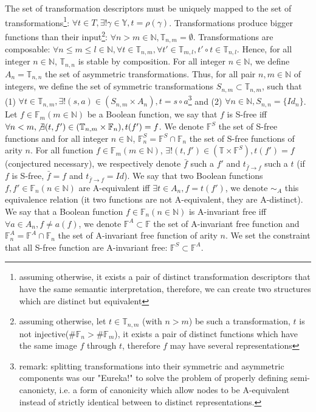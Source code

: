 \documentclass[a4paper,10pt]{article}
\newcommand{\N}{\mathbb{N}}%
\newcommand{\F}{\mathbb{F}}
\newcommand{\Y}{\mathbb{Y}}
\newcommand{\T}{\mathbb{T}}
\begin{document}
The set of transformation descriptors must be uniquely mapped to the set of transformations\footnote{assuming otherwise, it exists a pair of distinct transformation descriptors that have the same semantic interpretation, therefore, we can create two structures which are distinct but equivalent}: $\forall t\in T, \exists!\gamma\in\Y, t=\rho(\gamma)$.
Transformations produce bigger functions than their input\footnote{assuming otherwise, let $t\in\T_{n, m}$ (with $n>m$) be such a transformation, $t$ is not injective($\#\F_n > \#\F_m$), it exists a pair of distinct functions which have the same image $f$ through $t$, therefore $f$ may have several representations}: $\forall n > m \in\N, \T_{n, m}=\emptyset$.
Transformations are composable: $\forall n \leq m \leq l\in\N, \forall t\in\T_{n, m}, \forall t'\in\T_{m, l}, t' \circ t \in\T_{n, l}$.
Hence, for all integer $n\in\N$, $\T_{n, n}$ is stable by composition.
For all integer $n\in\N$, we define $A_n = \T_{n, n}$ the set of asymmetric transformations.
Thus, for all pair $n, m\in\N$ of integers, we define the set of symmetric transformations $S_{n, m} \subset \T_{n, m}$, such that (1) $\forall t\in\T_{n, m}, \exists!(s, a)\in(S_{n, m}\times A_n), t = s \circ a$\footnote{remark: splitting transformations into their symmetric and asymmetric components was our "Eureka!" to solve the problem of properly defining semi-canonicty, i.e. a form of canonicity which allow nodes to be A-equivalent instead of strictly identical between to distinct representations.} and (2) $\forall n\in\N, S_{n, n} = \{Id_n\}$.
Let $f\in\F_m (m\in\N)$ be a Boolean function, we say that $f$ is S-free iff $\forall n < m, \not\exists (t, f')\in(\T_{n, m}\times\F_n), t(f') = f$. We denote $\F^S$ the set of S-free functions and for all integer $n\in\N$, $\F^S_n  = \F^S\cap\F_n$ the set of S-free functions of arity $n$.
For all function $f\in\F_m (m\in\N)$, $\exists!(t, f')\in(\T\times\F^S), t(f') = f$ (conjectured necessary), we respectively denote $\bar{f}$ such a $f'$ and $t_{\bar{f}\rightarrow f}$ such a $t$ (if $f$ is S-free, $\bar{f}=f$ and $t_{\bar{f}\rightarrow f} = Id$).
We say that two Boolean functions $f, f'\in\F_n (n\in\N)$ are A-equivalent iff $\exists t\in A_n, f=t(f')$, we denote $\sim_A$ this equivalence relation (it two functions are not A-equivalent, they are A-distinct).
We say that a Boolean function $f\in\F_n (n\in\N)$ is A-invariant free iff $\forall a\in A_n, f\neq a(f)$, we denote $\F^A\subset\F$ the set of A-invariant free function and $\F^A_n = \F^A\cap\F_n$ the set of A-invariant free function of arity $n$.
We set the constraint that all S-free function are A-invariant free: $\F^S\subset\F^A$.
\end{document}
